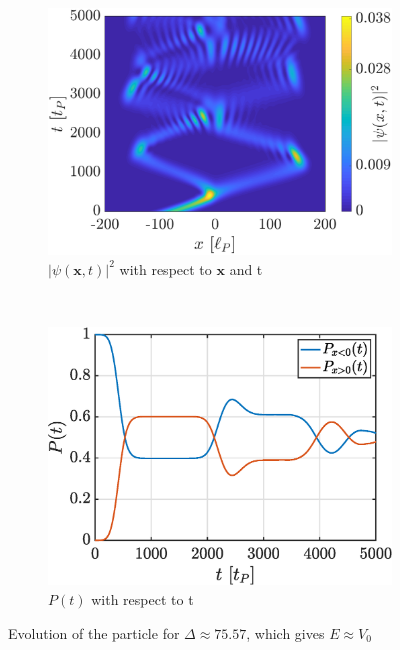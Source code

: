 \documentclass[a4paper,12pt,twoside]{article}
\newcommand{\mbf}[1]{\mathbf{#1}} %
\begin{document}
\begin{figure}[h]
  \centering
  \begin{subfigure}[t]{0.45\textwidth}
    \includegraphics[width=\textwidth]{graphs/iii_evo_Eeqv0_evo.eps}
    \caption{$|\psi(\mbf{x}, t)|^2$ with respect to $\mbf{x}$ and t}
    \label{fig:iii_evo_Eeqv0_evo}
  \end{subfigure}
  ~
  \begin{subfigure}[t]{0.45\textwidth}
    \includegraphics[width=\textwidth]{graphs/iii_evo_Eeqv0_prob.eps}
    \caption{$P(t)$ with respect to t}
    \label{fig:iii_evo_Eeqv0_prob}
  \end{subfigure}
  \caption{Evolution of the particle for $\Delta \approx 75.57$, which gives $E \approx V_0$}
  \label{fig:iii_evo_Eeqv0}
\end{figure}
\end{document}
